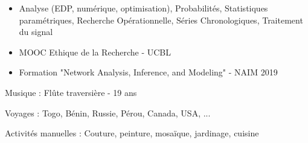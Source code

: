 \smallskip
{}
\begin{itemize}
\item 
    Analyse (EDP, numérique, optimisation), Probabilités, Statistiques paramétriques, Recherche Opérationnelle, Séries Chronologiques, Traitement du signal
\end{itemize}

\smallskip

\divider

\begin{itemize}
\item MOOC Ethique de la Recherche - UCBL
\item Formation "Network Analysis, Inference, and Modeling" - NAIM 2019
\end{itemize}





{ \color{emphasis} \faMusic \hspace{0.12cm}  Musique : } 
    Flûte traversière - 19 ans\\
  \vspace{0.25cm}

{\color{emphasis} \faGlobe \hspace{0.12cm} Voyages : }  
    Togo, Bénin, Russie, Pérou, Canada, USA, ...\\
  \vspace{0.25cm}
  
{\color{emphasis} \faCut  \hspace{0.12cm} Activités manuelles : }
    Couture, peinture, mosaïque, jardinage, cuisine

